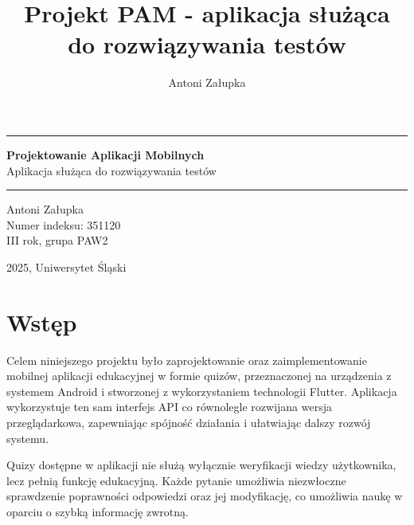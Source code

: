 \documentclass{article}
\title{Projekt PAM - aplikacja służąca do rozwiązywania testów}
\author{Antoni Załupka}
\begin{document}
	\thispagestyle{empty}
	
	
	\vspace{4cm}
	
	\rule{\linewidth}{2mm} 
	
	\begin{center}
		\huge \textbf{Projektowanie Aplikacji Mobilnych} \\
		\huge {Aplikacja służąca do rozwiązywania testów} \\
	\end{center}
	
	\rule{\linewidth}{0.5mm} 
	
	\vspace{2cm}
	
	\begin{center}
		\Large{Antoni Załupka} \\
		\Large{Numer indeksu: 351120} \\
		\Large{III rok, grupa PAW2} \\
		
	\end{center}
	
	
	\vspace{15cm}
	
	\begin{center}
		\Large{2025, Uniwersytet Śląski}
	\end{center}
	
	\newpage
	
	\tableofcontents
	
	\newpage
	
	\section{Wstęp}
	Celem niniejszego projektu było zaprojektowanie oraz zaimplementowanie mobilnej aplikacji edukacyjnej w formie quizów, przeznaczonej na urządzenia z systemem Android i stworzonej z wykorzystaniem technologii Flutter. Aplikacja wykorzystuje ten sam interfejs API co równolegle rozwijana wersja przeglądarkowa, zapewniając spójność działania i ułatwiając dalszy rozwój systemu.
	
	Quizy dostępne w aplikacji nie służą wyłącznie weryfikacji wiedzy użytkownika, lecz pełnią funkcję edukacyjną. Każde pytanie umożliwia niezwłoczne sprawdzenie poprawności odpowiedzi oraz jej modyfikację, co umożliwia naukę w oparciu o szybką informację zwrotną.
	
\end{document}
